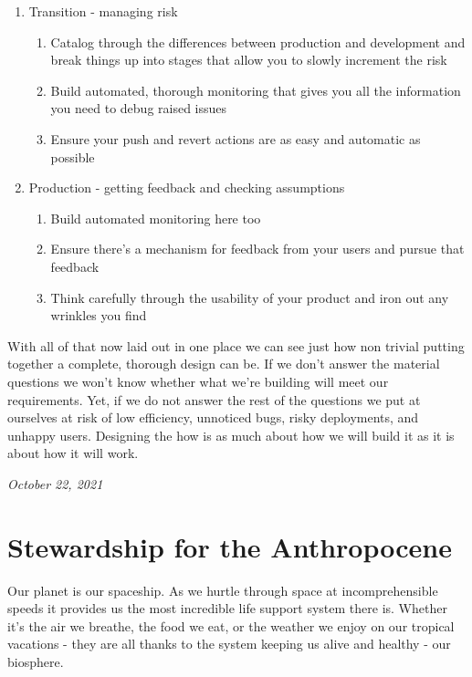 \documentclass[10pt,a5paper]{book}
\begin{document}
\begin{enumerate}
\begin{enumerate}
\begin{enumerate}
\end{enumerate}

\item Transition - managing risk
\begin{enumerate}
\item Catalog through the differences between production and development and break things up into stages that allow you to slowly increment the risk
\item Build automated, thorough monitoring that gives you all the information you need to debug raised issues
\item Ensure your push and revert actions are as easy and automatic as possible
\end{enumerate}

\item Production - getting feedback and checking assumptions
\begin{enumerate}
\item Build automated monitoring here too
\item Ensure there's a mechanism for feedback from your users and pursue that feedback
\item Think carefully through the usability of your product and iron out any wrinkles you find
\end{enumerate}


\end{enumerate}
With all of that now laid out in one place we can see just how non trivial putting together a complete, thorough design can be. If we don't answer the material questions we won't know whether what we're building will meet our requirements. Yet, if we do not answer the rest of the questions we put at ourselves at risk of low efficiency, unnoticed bugs, risky deployments, and unhappy users. Designing the how is as much about how we will build it as it is about how it will work. 
\end{enumerate}


\textit{October 22, 2021}

\section{Stewardship for the Anthropocene}
Our planet is our spaceship. As we hurtle through space at incomprehensible speeds it provides us the most incredible life support system there is. Whether it’s the air we breathe, the food we eat, or the weather we enjoy on our tropical vacations - they are all thanks to the system keeping us alive and healthy - our biosphere. 
\end{document}
